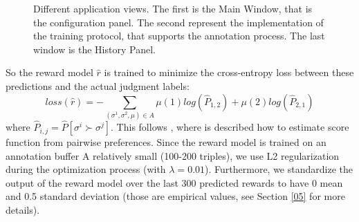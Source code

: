 \begin{figure}[t]
    \qquad
	\caption{Different application views. The first is the Main Window, that is the configuration panel. The second represent the implementation of the training protocol, that supports the annotation process. The last window is the History Panel.}%
	\label{fig:Application}%
\end{figure}

So the reward model $\hat{r}$ is trained to minimize the cross-entropy loss between these predictions and the actual judgment labels:
\begin{equation}\label{eq:rewardloss}
    loss(\hat{r}) = - \sum_{(\sigma^1,\sigma^2,\mu)\in A} \mu(1)log(\hat{P}_{1,2}) + \mu(2)log(\hat{P}_{2,1})
\end{equation}
where $\hat{P}_{i,j} = \hat{P}[\sigma^i \succ \sigma^j]$. This follows \cite{10.1093/biomet/39.3-4.324}, where is described how to estimate score function from pairwise preferences. Since the reward model is trained on an annotation buffer A relatively small (100-200 triples), we use L2 regularization during the optimization process (with $\lambda = 0.01$). Furthermore, we standardize the output of the reward model over the last 300 predicted rewards to have 0 mean and 0.5 standard deviation (those are empirical values, see Section \ref{05} for more details).

